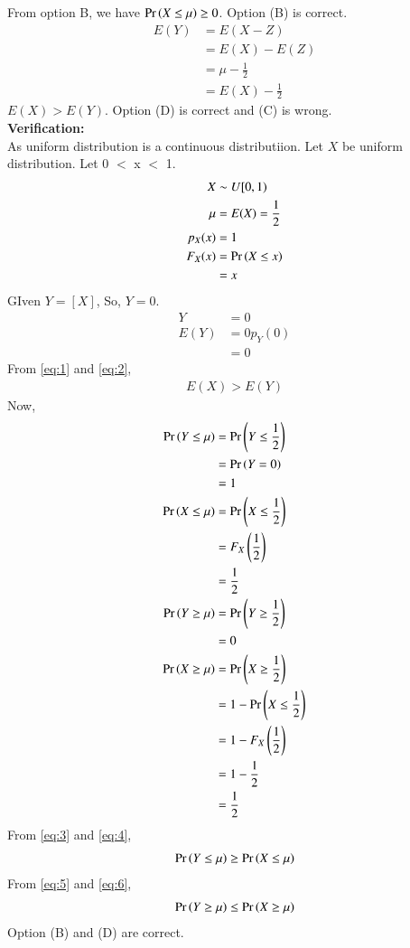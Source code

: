 \documentclass[journal,12pt,twocolumn]{IEEEtran}
\theoremstyle{remark}
\begin{document}
 From option B, we have $\Pr\left(X \leq \mu\right) \geq 0$. Option (B) is correct.
\begin{align}
E(Y)&=E(X-Z)\\
&=E(X)-E(Z)\\
&=\mu-\frac{1}{2}\\
&=E(X)-\frac{1}{2}
\end{align}
$E(X) > E(Y)$. Option (D) is correct and (C) is wrong.\\ \textbf{Verification:} \\
As uniform distribution is a continuous distributiion. Let $X$ be uniform distribution. Let 0 $<$ x $<$ 1.
\begin{align}
X &\sim U[0,1)\\
\mu&=E(X)=\frac{1}{2}
\label{eq:1}\\
p_X(x)&=1\\
F_X(x)&=\Pr\left(X \leq x\right)\\
&=x
\end{align}
GIven $Y=[X]$, So, $Y=0$.
\begin{align}
Y&=0\\
E(Y)&=0p_Y(0)\\
&=0
\label{eq:2}
\end{align}
From \eqref{eq:1} and \eqref{eq:2},
\begin{align}
E(X) > E(Y)
\end{align}
Now,
\begin{align}
\Pr\left(Y \leq \mu\right)&=\Pr\left(Y \leq \frac{1}{2}\right)\\
&=\Pr\left(Y=0\right)\\
&=1
\label{eq:3}\\
\Pr\left(X \leq \mu\right)&=\Pr\left(X \leq \frac{1}{2}\right)\\
&=F_X\left(\frac{1}{2}\right)\\
&=\frac{1}{2}
\label{eq:4}\\
\Pr\left(Y \geq \mu\right)&=\Pr\left(Y \geq \frac{1}{2}\right)\\
&=0
\label{eq:5}\\
\Pr\left(X \geq \mu\right)&=\Pr\left(X \geq \frac{1}{2}\right)\\
&=1-\Pr\left(X \leq \frac{1}{2}\right)\\
&=1-F_X\left(\frac{1}{2}\right)\\
&=1-\frac{1}{2}\\
&=\frac{1}{2}
\label{eq:6}
\end{align}
From \eqref{eq:3} and \eqref{eq:4},
\begin{align}
\Pr\left(Y \leq \mu\right) \geq \Pr\left(X \leq \mu\right)
\end{align}
From \eqref{eq:5} and \eqref{eq:6},
\begin{align}
\Pr\left(Y \geq \mu\right) \leq \Pr\left(X \geq \mu\right)
\end{align}
Option (B) and (D) are correct. 
\end{document}
